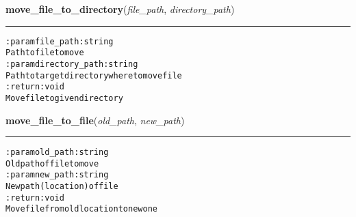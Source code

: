     \label{hal:files:models:Document:move_file_to_directory}

    \vspace{0.5ex}

\hspace{.8\funcindent}\begin{boxedminipage}{\funcwidth}

    \raggedright \textbf{move\_file\_to\_directory}(\textit{file\_path}, \textit{directory\_path})

    \vspace{-1.5ex}

    \rule{\textwidth}{0.5\fboxrule}
\setlength{\parskip}{2ex}
\begin{alltt}

:param file\_path: string
    Path to file to move
:param directory\_path: string
    Path to target directory where to move file
:return: void
    Move file to given directory
\end{alltt}

\setlength{\parskip}{1ex}
    \end{boxedminipage}

    \label{hal:files:models:Document:move_file_to_file}

    \vspace{0.5ex}

\hspace{.8\funcindent}\begin{boxedminipage}{\funcwidth}

    \raggedright \textbf{move\_file\_to\_file}(\textit{old\_path}, \textit{new\_path})

    \vspace{-1.5ex}

    \rule{\textwidth}{0.5\fboxrule}
\setlength{\parskip}{2ex}
\begin{alltt}

:param old\_path: string
    Old path of file to move
:param new\_path: string
    New path (location) of file
:return: void
    Move file from old location to new one
\end{alltt}

\setlength{\parskip}{1ex}
    \end{boxedminipage}

